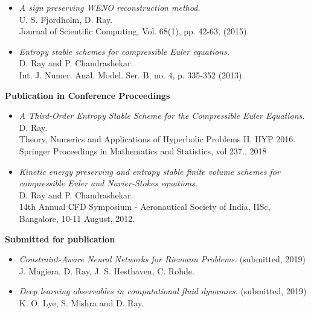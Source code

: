 \documentclass[margin]{res}
\begin{document}
\begin{resume}
\begin{itemize}
              \item {\it A sign preserving WENO reconstruction method.}\\
              U. S. Fjordholm, D. Ray. \\
              Journal of Scientific Computing, Vol. 68(1), pp. 42-63, (2015).
             
              \item {\it Entropy stable schemes for compressible Euler equations.}\\
              D. Ray and P. Chandrashekar.\\
              Int. J. Numer. Anal. Model. Ser. B, no. 4, p. 335-352 (2013).
             \end{itemize}



\textbf{Publication in Conference Proceedings}                
            \begin{itemize}           
              \item {\it A Third-Order Entropy Stable Scheme for the Compressible Euler Equations.}\\
              D. Ray.\\
              Theory, Numerics and Applications of Hyperbolic Problems II. HYP 2016. Springer Proceedings in Mathematics and Statistics, vol 237., 2018

              \item {\it Kinetic energy preserving and entropy stable finite volume schemes for compressible Euler and Navier-Stokes equations.}\\
              D. Ray and P. Chandrashekar.\\
              14th Annual CFD Symposium - Aeronautical Society of India, IISc, Bangalore, 10-11 August, 2012.
             \end{itemize}

\textbf{Submitted for publication}                
            \begin{itemize}           
              
              \item {\it Constraint-Aware Neural Networks for Riemann Problems}. (submitted, 2019) \\
               J. Magiera, D. Ray, J. S. Hesthaven, C. Rohde.
               
               \item {\it Deep learning observables in computational fluid dynamics}. (submitted, 2019) \\
               K. O. Lye, S. Mishra and D. Ray.
               

\end{itemize}
\end{resume}
\end{document}
